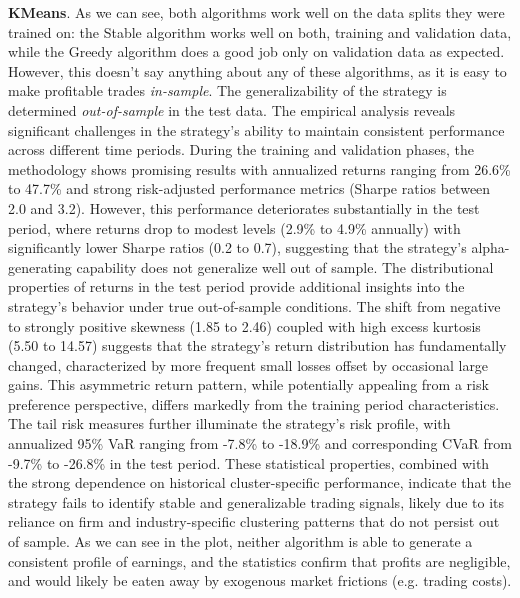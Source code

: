 \textbf{KMeans}. 
As we can see, both algorithms work well on the data splits they were trained on: the Stable algorithm works well on both, training and validation data, while the Greedy algorithm does a good job only on validation data as expected. However, this doesn't say anything about any of these algorithms, as it is easy to make profitable trades \textit{in-sample}. 
%
The generalizability of the strategy is determined \textit{out-of-sample} in the test data. The empirical analysis reveals significant challenges in the strategy's ability to maintain consistent performance across different time periods. During the training and validation phases, the methodology shows promising results with annualized returns ranging from 26.6\% to 47.7\% and strong risk-adjusted performance metrics (Sharpe ratios between 2.0 and 3.2). However, this performance deteriorates substantially in the test period, where returns drop to modest levels (2.9\% to 4.9\% annually) with significantly lower Sharpe ratios (0.2 to 0.7), suggesting that the strategy's alpha-generating capability does not generalize well out of sample. The distributional properties of returns in the test period provide additional insights into the strategy's behavior under true out-of-sample conditions. The shift from negative to strongly positive skewness (1.85 to 2.46) coupled with high excess kurtosis (5.50 to 14.57) suggests that the strategy's return distribution has fundamentally changed, characterized by more frequent small losses offset by occasional large gains. This asymmetric return pattern, while potentially appealing from a risk preference perspective, differs markedly from the training period characteristics. The tail risk measures further illuminate the strategy's risk profile, with annualized 95\% VaR ranging from -7.8\% to -18.9\% and corresponding CVaR from -9.7\% to -26.8\% in the test period. These statistical properties, combined with the strong dependence on historical cluster-specific performance, indicate that the strategy fails to identify stable and generalizable trading signals, likely due to its reliance on firm and industry-specific clustering patterns that do not persist out of sample. As we can see in the plot, neither algorithm is able to generate a consistent profile of earnings, and the statistics confirm that profits are negligible, and would likely be eaten away by exogenous market frictions (e.g. trading costs).


